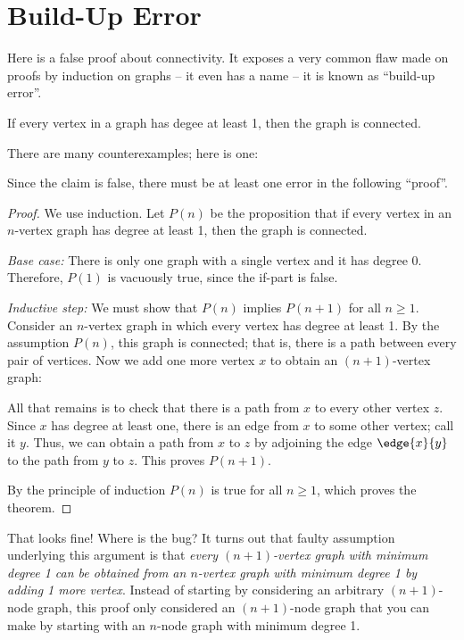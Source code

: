 \documentclass[12pt,twoside]{article}
\begin{document}


\section{Build-Up Error}

Here is a false proof about connectivity.  It exposes a very common
flaw made on proofs by induction on graphs -- it even has a name --
it is known as ``build-up error''.


\begin{falseclm*}
If every vertex in a graph has degee at least 1, then the graph is
connected.
\end{falseclm*}


There are many counterexamples; here is one:


Since the claim is false, there must be at least one error in the
following ``proof''.  

\begin{proof}
We use induction.  Let $P(n)$ be the proposition that if every vertex
in an $n$-vertex graph has degree at least 1, then the graph is
connected.

\noindent \textit{Base case:} There is only one graph with a single
vertex and it has degree 0.  Therefore, $P(1)$ is vacuously true,
since the if-part is false.

\noindent \textit{Inductive step:} We must show that $P(n)$ implies
$P(n+1)$ for all $n \geq 1$.  Consider an $n$-vertex graph in which
every vertex has degree at least 1.  By the assumption $P(n)$, this
graph is connected; that is, there is a path between every pair of
vertices.  Now we add one more vertex $x$ to obtain an $(n+1)$-vertex
graph:


All that remains is to check that there is a path from $x$ to every
other vertex $z$.  Since $x$ has degree at least one, there is an edge
from $x$ to some other vertex; call it $y$.  Thus, we can obtain a
path from $x$ to $z$ by adjoining the edge $\edge{x}{y}$ to the path
from $y$ to $z$.  This proves $P(n+1)$.

By the principle of induction $P(n)$ is true for all $n \geq 1$, which
proves the theorem.
\end{proof}

That looks fine!  Where is the bug?  It turns out that
faulty assumption underlying this argument is that
\textit{every $(n+1)$-vertex graph with minimum degree 1 can be
obtained from an $n$-vertex graph with minimum degree 1 by adding 1
more vertex}.  Instead of starting by considering an arbitrary $(n+1)$- node
graph, this proof only considered an $(n+1)$-node graph that you
can make by starting with  an $n$-node graph with minimum degree 1.
\end{document}
